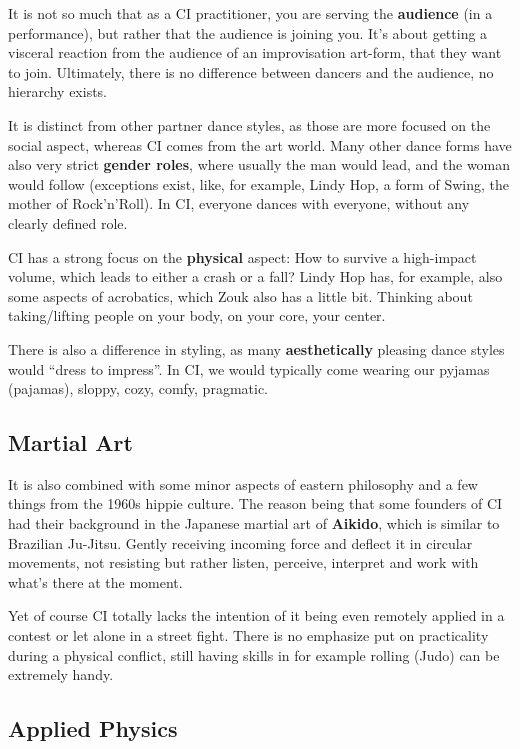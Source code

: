 It is not so much that as a CI practitioner, you are serving the \textbf{audience} (in a performance), but rather that the audience is joining you.
It's about getting a visceral reaction from the audience of an improvisation art-form, that they want to join.
Ultimately, there is no difference between dancers and the audience, no hierarchy exists.

It is distinct from other partner dance styles, as those are more focused on the social aspect, whereas CI comes from the art world.
Many other dance forms have also very strict \textbf{gender roles}, where usually the man would lead, and the woman would follow (exceptions exist, like, for example, Lindy Hop, a form of Swing, the mother of Rock'n'Roll).
In CI, everyone dances with everyone, without any clearly defined role.

CI has a strong focus on the \textbf{physical} aspect: How to survive a high-impact volume, which leads to either a crash or a fall?
Lindy Hop has, for example, also some aspects of acrobatics, which Zouk also has a little bit.
Thinking about taking/lifting people on your body, on your core, your center.

There is also a difference in styling, as many \textbf{aesthetically} pleasing dance styles would ``dress to impress''.
In CI, we would typically come wearing our pyjamas (pajamas), sloppy, cozy, comfy, pragmatic.

\subsection{Martial Art}\label{subsec:martial-art}

It is also combined with some minor aspects of eastern philosophy and a few things from the 1960s hippie culture.
The reason being that some founders of CI had their background in the Japanese martial art of \textbf{Aikido}, which is similar to Brazilian Ju-Jitsu.
Gently receiving incoming force and deflect it in circular movements, not resisting but rather listen, perceive, interpret and work with what's there at the moment.

Yet of course CI totally lacks the intention of it being even remotely applied in a contest or let alone in a street fight.
There is no emphasize put on practicality during a physical conflict, still having skills in for example rolling (Judo) can be extremely handy.

\subsection{Applied Physics}\label{subsec:applied-physics}

